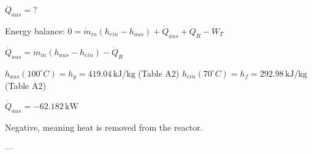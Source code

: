\( \dot{Q}_{aus} = ? \)  

Energy balance:  
\( 0 = \dot{m}_{in} (h_{ein} - h_{aus}) + \dot{Q}_{aus} + \dot{Q}_R - \dot{W}_T \)  

\( \dot{Q}_{aus} = \dot{m}_{in} (h_{aus} - h_{ein}) - \dot{Q}_R \)  

\( h_{aus} (100^\circ C) = h_g = 419.04 \, \text{kJ/kg} \) (Table A2)  
\( h_{ein} (70^\circ C) = h_f = 292.98 \, \text{kJ/kg} \) (Table A2)  

\( \dot{Q}_{aus} = -62.182 \, \text{kW} \)  

Negative, meaning heat is removed from the reactor.  

---